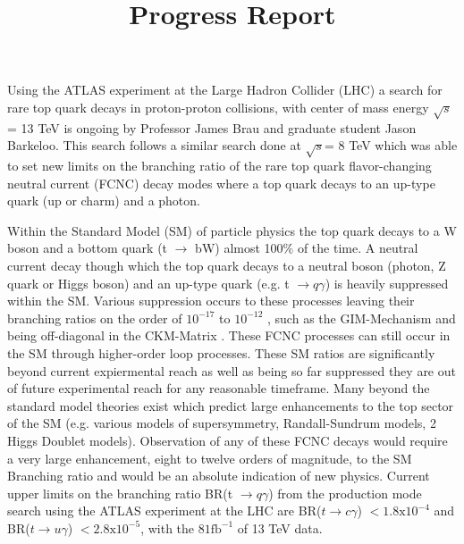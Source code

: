 \documentclass[12pt,letterpaper]{article}
\begin{document}
\title{Progress Report}  \date{\vspace{-10ex}}

\maketitle

\par Using the ATLAS experiment at the Large Hadron Collider (LHC) a search for rare top quark decays in proton-proton collisions,  with center of mass energy $\sqrt{s}$ = 13 TeV is ongoing by Professor James Brau and graduate student Jason Barkeloo.  This search follows a similar search done at $\sqrt{s}$= 8 TeV which was able to set new limits on the branching ratio of the rare top quark flavor-changing neutral current (FCNC) decay modes where a top quark decays to an up-type quark (up or charm) and a photon.

\par Within the Standard Model (SM) of particle physics the top quark decays to a W boson and a bottom quark (t $\rightarrow$ bW) almost 100$\%$ of the time.  A neutral current decay though which the top quark decays to a neutral boson (photon, Z quark or Higgs boson) and an up-type quark (e.g. t $\rightarrow q\gamma$) is heavily suppressed within the SM.  Various suppression occurs to these processes leaving their branching ratios on the order of $ 10^{-17}$ to $10^{-12}$ \cite{snowmass}, such as the GIM-Mechanism \cite{gim} and being off-diagonal in the CKM-Matrix \cite{ckm}.  These FCNC processes can still occur in the SM through higher-order loop processes.  These SM ratios are significantly beyond current expiermental reach as well as being so far suppressed they are out of future experimental reach for any reasonable timeframe.  Many beyond the standard model theories exist which predict large enhancements to the top sector of the SM (e.g. various models of supersymmetry, Randall-Sundrum models, 2 Higgs Doublet models).  Observation of any of these FCNC decays would require a very large enhancement, eight to twelve orders of magnitude, to the SM Branching ratio and would be an absolute indication of new physics.  Current upper limits on the branching ratio BR(t $\rightarrow q\gamma$) from the production mode search using the ATLAS experiment at the LHC are BR($t \rightarrow c\gamma$) $< 1.8\text{x}10^{-4}$ and BR($t \rightarrow u\gamma$) $< 2.8\text{x} 10^{-5}$, with the $81\text{fb}^{-1}$ of 13 TeV data\cite{gregor}.  
\end{document}
